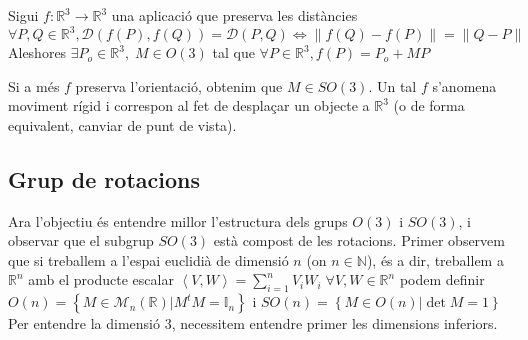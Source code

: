 \documentclass[a4paper,12pt]{article}
\begin{document}
	\begin{teorema}
	    Sigui $f: \mathbb{R}^3 \to \mathbb{R}^3$ una aplicació que preserva les distàncies $\forall P, Q \in \mathbb{R}^3, \mathcal{D}\left(f(P), f(Q)\right) = \mathcal{D}(P, Q) \Leftrightarrow \left\lVert f(Q)-f(P)\right\rVert = \left\lVert Q-P\right\rVert$
	    Aleshores $\exists P_o \in \mathbb{R}^3,\; M \in O(3)$ tal que $\forall P \in \mathbb{R}^3, f(P) = P_o + MP$
	\end{teorema}

	\begin{definicio}
	    Si a més $f$ preserva l'orientació, obtenim que $M \in SO(3)$.
	    Un tal $f$ s'anomena moviment rígid i correspon al fet de desplaçar un objecte a $\mathbb{R}^3$
	    (o de forma equivalent, canviar de punt de vista).
	\end{definicio}

	\subsection{Grup de rotacions}

	Ara l'objectiu és entendre millor l'estructura dels grups $O(3)$ i $SO(3)$, i observar que el
	subgrup $SO(3)$ està compost de les rotacions.
	Primer observem que si treballem a l'espai euclidià de dimensió $n$ (on $n \in \mathbb{N}$), és a
	dir, treballem a $\mathbb{R}^n$ amb el producte escalar $\left\langle V, W\right\rangle = \sum\limits_{i = 1}^{n} V_i W_i\; \forall V, W \in \mathbb{R}^n$
	podem definir $O(n) = \left\{M \in \mathcal{M}_n(\mathbb{R}) | M^tM = \mathbb{I}_n\right\}$ i $SO(n) = \left\{M \in O(n) | \det{M} = 1\right\}$\\
	Per entendre la dimensió $3$, necessitem entendre primer les dimensions inferiors.
\end{document}
